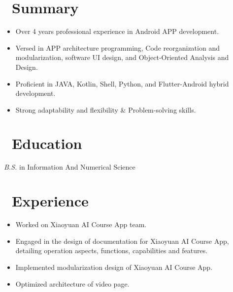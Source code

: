 \documentclass{resume}
\begin{document}




    \section{\faStarO\ Summary}
    \begin{itemize}[parsep=0.5ex]
        \item Over 4 years professional experience in Android APP development.
        \item Versed in APP architecture programming, Code reorganization and modularization,
        software UI design, and Object-Oriented Analysis and Design.
        \item Proficient in JAVA, Kotlin, Shell, Python, and Flutter-Android hybrid development.
        \item Strong adaptability and flexibility \& Problem-solving skills.
    \end{itemize}


    \section{\faGraduationCap\ Education}
    \textit{B.S.} in Information And Numerical Science

    \section{\faUsers\ Experience}
    \begin{itemize}
        \item Worked on Xiaoyuan AI Course App team.
        \item Engaged in the design of documentation for Xiaoyuan AI Course App, detailing operation aspects, functions, capabilities and features.
        \item Implemented modularization design of Xiaoyuan AI Course App.
        \item Optimized architecture of video page.
    \end{itemize}
\end{document}
